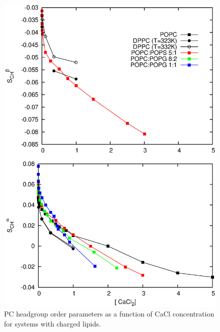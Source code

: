 \documentclass[aps,prl,superscriptaddress,twocolumn]{revtex4}
\begin{document}
\begin{figure}[]
  \centering
  \includegraphics[width=17.2cm]{../Figs/LIPIDSwithCaCl.eps}
  \caption{\label{OrderParametersWithCaCl}
    PC headgroup order parameters as a function of CaCl concentration for systems with charged lipids.
  }
\end{figure}
\end{document}
